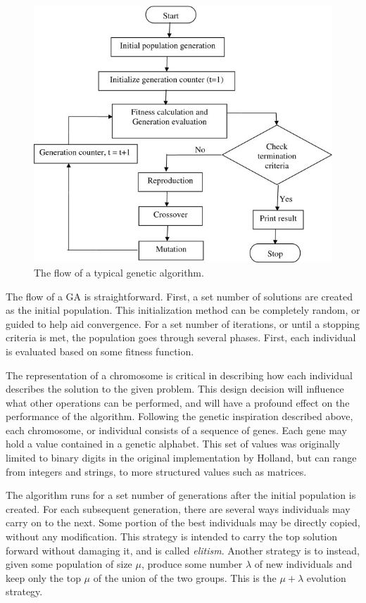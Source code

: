 \begin{figure}[!htb]
	\begin{center}
		\includegraphics[scale=.5]{images/genetic_typical.png}
	\end{center}
	\caption{The flow of a typical genetic algorithm.}
	\label{logo}
\end{figure}

The flow of a GA is straightforward. First, a set number of solutions are created as the initial population. This initialization method can be completely random, or guided to help aid convergence. For a set number of iterations, or until a stopping criteria is met, the population goes through several phases. First, each individual is evaluated based on some fitness function. 

The representation of a chromosome is critical in describing how each individual describes the solution to the given problem. This design decision will influence what other operations can be performed, and will have a profound effect on the performance of the algorithm. Following the genetic inspiration described above, each chromosome, or individual consists of a sequence of genes. Each gene may hold a value contained in a genetic alphabet. This set of values was originally limited to binary digits in the original implementation by Holland, but can range from integers and strings, to more structured values such as matrices.

The algorithm runs for a set number of generations after the initial population is created. For each subsequent generation, there are several ways individuals may carry on to the next. Some portion of the best individuals may be directly copied, without any modification. This strategy is intended to carry the top solution forward without damaging it, and is called \textit{elitism}. Another strategy is to instead, given some population of size $\mu$, produce some number $\lambda$ of new individuals and keep only the top $\mu$ of the union of the two groups. This is the $\mu+\lambda$ evolution strategy.


